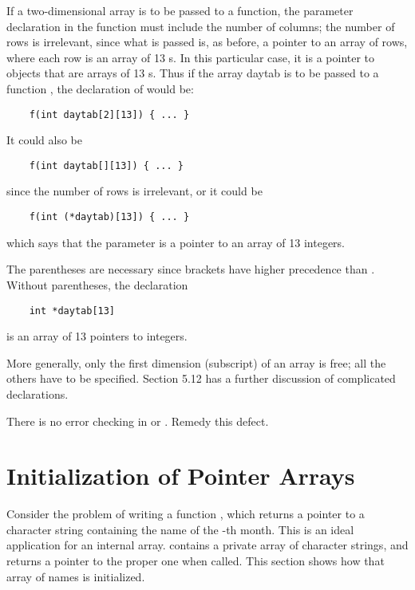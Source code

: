 If a two-dimensional array is to be passed to a function, the parameter declaration in the function must include the number of columns;
the number of rows is irrelevant, since what is passed is, as before, a pointer to an array of rows, where each row is an array of 13 s.
In this particular case, it is a pointer to objects that are arrays of 13 s.
Thus if the array daytab is to be passed to a function , the declaration of  would be:
\begin{lstlisting}
    f(int daytab[2][13]) { ... }
\end{lstlisting}
It could also be
\begin{lstlisting}
    f(int daytab[][13]) { ... }
\end{lstlisting}
since the number of rows is irrelevant, or it could be
\begin{lstlisting}
    f(int (*daytab)[13]) { ... }
\end{lstlisting}
which says that the parameter is a pointer to an array of 13 integers.

The parentheses are necessary since brackets \code{[]} have higher precedence than \code{*}.
Without parentheses, the declaration
\begin{lstlisting}
    int *daytab[13]
\end{lstlisting}
is an array of 13 pointers to integers.

More generally, only the first dimension (subscript) of an array is free; all the others have to be specified.
Section 5.12 has a further discussion of complicated declarations.
\newline

\begin{ExerciseList}
\Exercise There is no error checking in  or . Remedy this defect.
\end{ExerciseList}



\section{Initialization of Pointer Arrays}


Consider the problem of writing a function , which returns a pointer to a character string containing the name of the -th month.
This is an ideal application for an internal  array.
 contains a private array of character strings, and returns a pointer to the proper one when called.
This section shows how that array of names is initialized.

